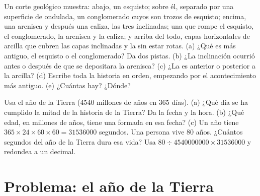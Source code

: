 \begin{exercise}[$\star\star\star$]\label{exo:g7:geological-time:11}
Un corte geológico muestra: abajo, un esquisto; sobre él, separado por una
superficie de  ondulada, un conglomerado cuyos  son trozos de
esquisto; encima, una arenisca y después una caliza, las tres inclinadas;
una  que rompe el esquisto, el conglomerado, la arenisca y la caliza;
y arriba del todo, capas horizontales de arcilla que cubren las capas
inclinadas y la  sin estar rotas. (a) ¿Qué es más antiguo, el
esquisto o el conglomerado? Da dos pistas. (b) ¿La inclinación ocurrió
antes o después de que se depositara la arenisca? (c) ¿La  es
anterior o posterior a la arcilla? (d) Escribe toda la historia en orden,
empezando por el acontecimiento más antiguo. (e) ¿Cuántas 
hay? ¿Dónde?
\end{exercise}

\begin{exercise}[$\star\star\star$]\label{exo:g7:geological-time:12}
Usa el año de la Tierra (\num{4540} millones de años en 365 días). (a) ¿Qué
día se ha cumplido la mitad de la historia de la Tierra? Da la fecha y la
hora. (b) ¿Qué edad, en millones de años, tiene una  formada en esa
fecha? (c) Un año tiene $365 \times 24 \times 60 \times 60 = \num{31536000}$
segundos. Una persona vive 80 años. ¿Cuántos segundos del año de la Tierra
dura esa vida? Usa $80 \div \num{4540000000} \times
\num{31536000}$ y redondea a un decimal.
\end{exercise}

\section{Problema: el año de la Tierra}

